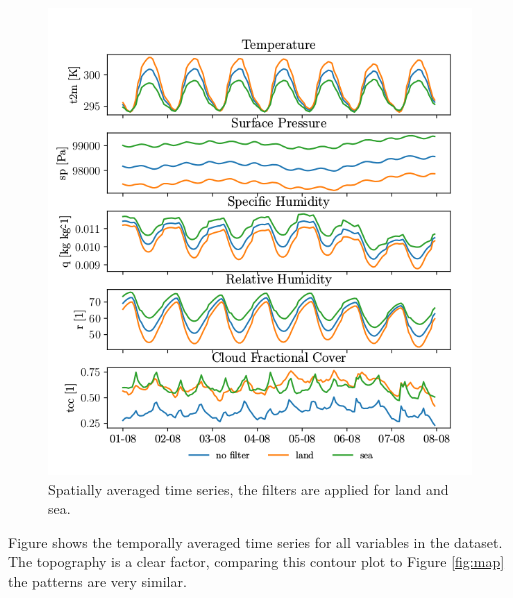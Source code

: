 \begin{figure}[ht]
    \centering
    \includegraphics{python_figs/spatially_averaged_one_week_from_2012-08-01.png}
    \caption{Spatially averaged time series, the filters are applied for land and sea.}
    \label{fig:random_week}
\end{figure}
Figure %
shows the temporally averaged time series for all variables in the dataset. The topography is a clear factor, comparing this contour plot to Figure \ref{fig:map} the patterns are very similar. 

